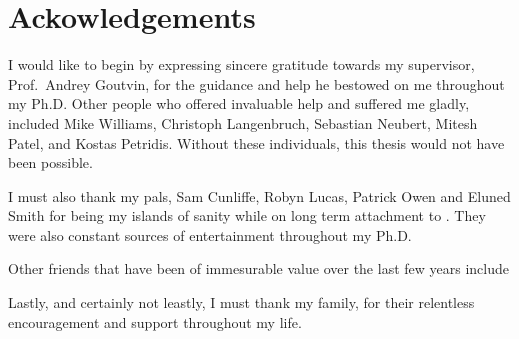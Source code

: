 \clearpage
\chapter*{\centering Ackowledgements}
\begin{center}
  {\setlength{\currentparskip}{\parskip}%
  \begin{minipage}{0.8\textwidth}
    \setlength{\parskip}{\currentparskip}%
    I would like to begin by expressing sincere gratitude towards my supervisor, Prof.~Andrey
    Goutvin, for the guidance and help he bestowed on me throughout my Ph.D.
    Other people who offered invaluable help and suffered me gladly, included
    Mike Williams, Christoph Langenbruch, Sebastian Neubert, Mitesh Patel, and
    Kostas Petridis.
    Without these individuals, this thesis would not have been possible.

    I must also thank my pals, Sam Cunliffe, Robyn Lucas, Patrick Owen and Eluned Smith for being
    my islands of sanity while on long
    term attachment to \cern.
    They were also constant sources of entertainment throughout my Ph.D.

    Other friends that have been of immesurable value over the last few years include

    Lastly, and certainly not leastly, I must thank my family, for their relentless encouragement
    and support throughout my life.

  \end{minipage}}
\end{center}




